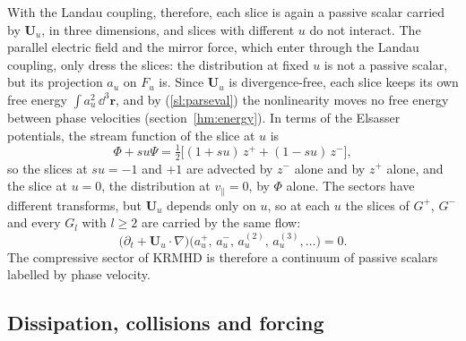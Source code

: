 With the Landau coupling, therefore, each slice is again a passive scalar carried by $\boldsymbol U_u$, in three dimensions, and slices with different $u$ do not interact. The parallel electric field and the mirror force, which enter through the Landau coupling, only dress the slices: the distribution at fixed $u$ is not a passive scalar, but its projection $a_u$ on $F_u$ is. Since $\boldsymbol U_u$ is divergence-free, each slice keeps its own free energy $\int a_u^2\,\dd^3\boldsymbol r$, and by (\ref{sl:parseval}) the nonlinearity moves no free energy between phase velocities (section~\ref{hm:energy}). In terms of the Elsasser potentials, the stream function of the slice at $u$ is
\begin{equation}\label{eq:elsasserpot}
  \Phi+su\Psi=\tfrac12\big[(1+su)\,z^++(1-su)\,z^-\big],
\end{equation}
so the slices at $su=-1$ and $+1$ are advected by $z^-$ alone and by $z^+$ alone, and the slice at $u=0$, the distribution at $v_\parallel=0$, by $\Phi$ alone. The sectors have different transforms, but $\boldsymbol U_u$ depends only on $u$, so at each $u$ the slices of $G^+$, $G^-$ and every $G_l$ with $l\ge2$ are carried by the same flow:
\begin{equation}\label{eq:sameflow}
  \big(\partial_t+\boldsymbol U_u\cdot\nabla\big)\big(a^+_u,\,a^-_u,\,a^{(2)}_u,\,a^{(3)}_u,\dots\big)=0 .
\end{equation}
The compressive sector of KRMHD is therefore a continuum of passive scalars labelled by phase velocity.

\subsection{Dissipation, collisions and forcing}\label{sl:forcingsec}

